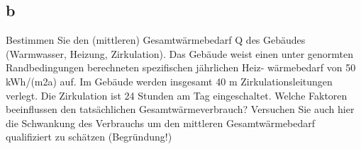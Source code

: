\subsection{b}
Bestimmen Sie den (mittleren) Gesamtwärmebedarf Q des Gebäudes (Warmwasser, Heizung, Zirkulation).
Das Gebäude weist einen unter genormten Randbedingungen berechneten spezifischen jährlichen Heiz-
wärmebedarf von 50 kWh/(m2a) auf. Im Gebäude werden insgesamt 40 m Zirkulationsleitungen verlegt.
Die Zirkulation ist 24 Stunden am Tag eingeschaltet.
Welche Faktoren beeinflussen den tatsächlichen Gesamtwärmeverbrauch? Versuchen Sie auch hier die
Schwankung des Verbrauchs um den mittleren Gesamtwärmebedarf
 qualifiziert zu schätzen
(Begründung!)